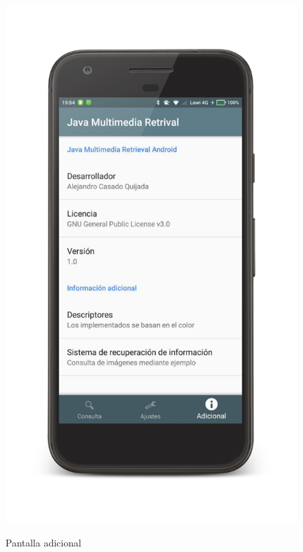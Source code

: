\begin{figure}[H] %
\centering
\includegraphics[scale=0.15]{imagenes/adicional.png}  %
\label{adicional.png}
\caption{Pantalla adicional}
\end{figure}








